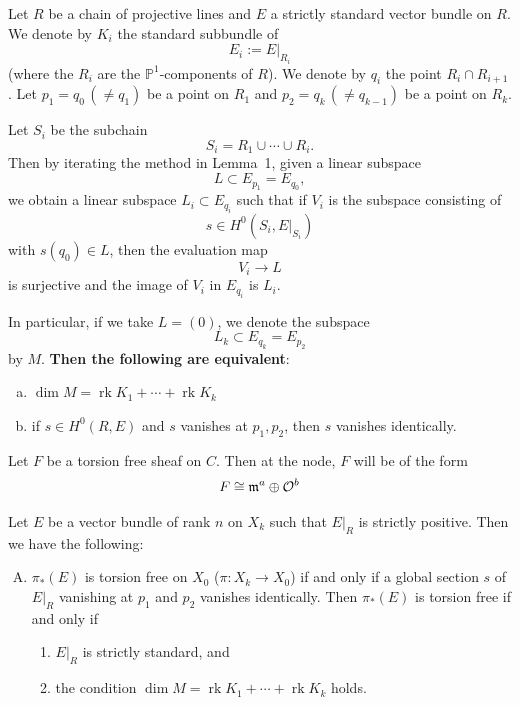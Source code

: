 \documentclass[12pt]{article}
\begin{document}
\begin{remark}
Let $R$ be a chain of projective lines and $E$ a strictly standard vector bundle on $R$.
We denote by $K_i$ the standard subbundle of
\[
E_i := E|_{R_i}
\]
(where the $R_i$ are the $\mathbb{P}^1$-components of $R$).
We denote by $q_i$ the point $R_i \cap R_{i+1}$.
Let $p_1 = q_0 \,(\neq q_1)$ be a point on $R_1$ and
$p_2 = q_k \,(\neq q_{k-1})$ be a point on $R_k$.

Let $S_i$ be the subchain
\[
S_i = R_1 \cup \cdots \cup R_i .
\]
Then by iterating the method in Lemma~1, given a linear subspace
\[
L \subset E_{p_1} = E_{q_0},
\]
we obtain a linear subspace $L_i \subset E_{q_i}$ such that if $V_i$ is the subspace consisting of
\[
s \in H^0(S_i, E|_{S_i})
\]
with $s(q_0) \in L$, then the evaluation map
\[
V_i \to L
\]
is surjective and the image of $V_i$ in $E_{q_i}$ is $L_i$.

In particular, if we take $L=(0)$, we denote the subspace
\[
L_k \subset E_{q_k} = E_{p_2}
\]
by $M$. \textbf{Then the following are equivalent}:
\begin{enumerate}[(a)]
\item
$\dim M = \operatorname{rk} K_1 + \cdots + \operatorname{rk} K_k$
\item
if $s \in H^0(R,E)$ and $s$ vanishes at $p_1,p_2$, then $s$ vanishes identically.
\end{enumerate}
\end{remark}


Let $F$ be a torsion free sheaf on $C$. Then at the node, $F$ will be of the form \begin{align*}
    F \cong \mathfrak{m}^a \oplus {\mathcal{O}}^b
\end{align*}

\begin{proposition}[NS 5]
Let $E$ be a vector bundle of rank $n$ on $X_k$ such that $E|_R$ is strictly positive. Then we have the following:

\begin{enumerate}[(A)]
\item $\pi_*(E)$ is torsion free on $X_0$ ($\pi : X_k \to X_0$) if and only if a global section $s$ of $E|_R$ vanishing at $p_1$ and $p_2$ vanishes identically. Then $\pi_*(E)$ is torsion free if and only if
\begin{enumerate}[(1)]
\item $E|_R$ is strictly standard, and
\item the condition $\dim M = \operatorname{rk} K_1 + \cdots + \operatorname{rk} K_k$ holds.
\end{enumerate}
\end{enumerate}
\end{proposition}
\end{document}
